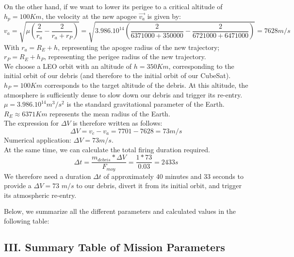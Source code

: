 \documentclass[11pt,a4paper]{article}
\begin{document}
\begin{itemize}
On the other hand, if we want to lower its perigee to a critical altitude of \textbf{$h_{p}= 100Km$}, the velocity at the new apogee \textbf{$\vec {v_{a}}$} is given by:
\begin{equation}
  \boxed{  v_{a} = \sqrt {\mu \left(\frac{2}{r_{a}} -\frac{2}{r_{a} + r_{P}}\right )} = \sqrt {3.986.10^{14}\left(\frac{2}{6371000 + 350000} -\frac{2}{6721000 + 6471000}\right )} = 7628 m/s}
\end{equation}
With $r_{a} = R_{E} + h$, representing the apogee radius of the new trajectory;\\
$r_{P} = R_{E} + h_{P}$, representing the perigee radius of the new trajectory.\\
We choose a LEO orbit with an altitude of $h = 350Km$, corresponding to the initial orbit of our debris (and therefore to the initial orbit of our CubeSat).\\
$h_{P} = 100Km$ corresponds to the target altitude of the debris. At this altitude, the atmosphere is sufficiently dense to slow down our debris and trigger its re-entry. \\
$\mu = 3.986.10^{14} m^{3}/s^{2}$ is the standard gravitational parameter of the Earth.\\
$R_{E} \approx 6371 Km$ represents the mean radius of the Earth.\\
The expression for $\Delta V$ is therefore written as follows:
\begin{equation}
    \boxed{\Delta V = v_{c} - v_{a} = 7701 -7628 = 73m/s}
\end{equation}
Numerical application: $\boxed{\Delta V = 73  m/s}$.\\
At the same time, we can calculate the total firing duration required. \\
\begin{equation}
    \boxed{\Delta t = \frac{m_{debris} * \Delta V}{F_{moy}} = \frac{1* 73}{0.03} = 2433 s }
\end{equation}
We therefore need a duration $\Delta t$ of approximately $40$ minutes and $33$ seconds to provide a $\Delta V = 73$ $m/s$ to our debris, divert it from its initial orbit, and trigger its atmospheric re-entry. \cite{Vallado2013}\\
\end{itemize}

Below, we summarize all the different parameters and calculated values in the following table:

\subsection*{III. Summary Table of Mission Parameters}
\end{document}
